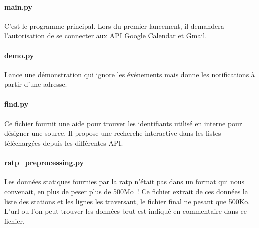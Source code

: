 \documentclass[a4paper, 8pt]{article}
\begin{document}
\paragraph{main.py} C'est le programme principal. Lors du premier lancement,
il demandera l'autorisation de se connecter aux API Google Calendar et Gmail.

\paragraph{demo.py} Lance une démonstration qui ignore les événements mais donne les
notifications à partir d'une adresse.

\paragraph{find.py} Ce fichier fournit une aide
pour trouver les identifiants utilisé en interne pour désigner une source.
Il propose une recherche interactive dans les listes téléchargées depuis les
différentes API.

\paragraph{ratp\_preprocessing.py} Les données statiques fournies par la ratp
n'était pas dans un format qui nous convenait, en plus de peser plus de 500Mo~!
Ce fichier extrait de ces données la liste des stations et les lignes les
traversant, le fichier final ne pesant que 500Ko.
L'url ou l'on peut trouver les données brut est indiqué en
commentaire dans ce fichier.
\end{document}
